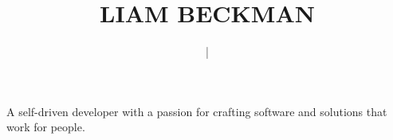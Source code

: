 \title{\textcolor{my-red}{LIAM BECKMAN}}
\author{
     \textcolor{my-grey}{|} 
}

\date{\vspace{-2em}}



\maketitle

\begin{center}
A self-driven developer with a passion for crafting software and solutions that work for people.\\
\end{center}
